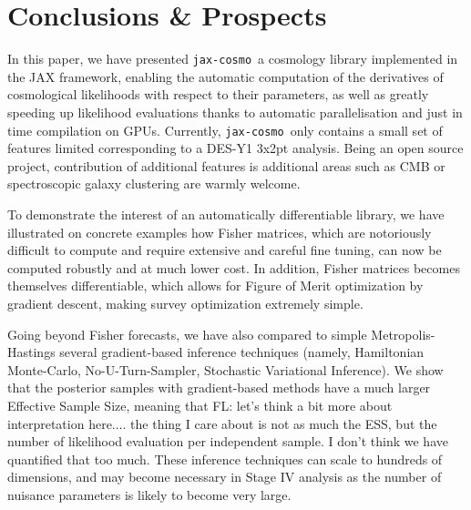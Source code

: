 \documentclass[twocolumn,twocolappendix,nofootinbib,iop]{openjournal}
\newcommand{\FrL}[1]{{\color{cyan}FL: #1}}
\newcommand{\jaxcosmo}{\texttt{jax-cosmo}}
\begin{document}
\section{Conclusions \& Prospects}
\label{sec-conclusion}

In this paper, we have presented \jaxcosmo\ a cosmology library implemented in the JAX framework, enabling the automatic computation of the derivatives of cosmological likelihoods with respect to their parameters, as well as greatly speeding up likelihood evaluations thanks to automatic parallelisation and just in time compilation on GPUs. Currently, \jaxcosmo\ only contains a small set of features limited corresponding to a DES-Y1 3x2pt analysis. Being an open source project, contribution of additional features is additional areas such as CMB or spectroscopic galaxy clustering are warmly welcome. 

To demonstrate the interest of an automatically differentiable library, we have illustrated on concrete examples how Fisher matrices, which are notoriously difficult to compute and require extensive and careful fine tuning, can now be computed robustly and at much lower cost. In addition, Fisher matrices becomes themselves differentiable, which allows for  Figure of Merit optimization by gradient descent, making survey optimization extremely simple. 

Going beyond Fisher forecasts, we have also compared to simple Metropolis-Hastings several gradient-based inference techniques (namely, Hamiltonian Monte-Carlo, No-U-Turn-Sampler, Stochastic Variational Inference). We show that the posterior samples with gradient-based methods have a much larger Effective Sample Size, meaning that \FrL{let's think a bit more about interpretation here.... the thing I care about is not as much the ESS, but the number of likelihood evaluation per independent sample. I don't think we have quantified that too much}. These inference techniques can scale to hundreds of dimensions, and may become necessary in Stage IV analysis as the number of nuisance parameters is likely to become very large.
\end{document}
